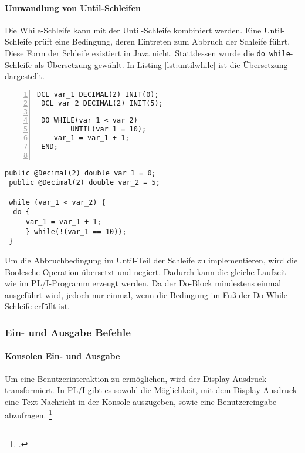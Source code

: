 \pagebreak
\paragraph*{Umwandlung von Until-Schleifen}

Die While-Schleife kann mit der Until-Schleife kombiniert werden. Eine Until-Schleife prüft eine Bedingung, deren Eintreten zum Abbruch der Schleife führt. Diese Form der Schleife existiert in Java nicht. Stattdessen wurde die \verb+do while+-Schleife als Übersetzung gewählt. In Listing \ref{lst:untilwhile} ist die Übersetzung dargestellt.

\begin{minipage}[b]{0.48\linewidth}
	\centering
	\lstset{language=PL/I,label=SliceExaple}
	\begin{lstlisting}[frame=single, numbers=left, mathescape,%
		caption={Transformation Until-Schleife}, label={lst:untilwhile}, basicstyle=\fontsize{9}{13}\selectfont\ttfamily]
 DCL var_1 DECIMAL(2) INIT(0);
 DCL var_2 DECIMAL(2) INIT(5);
		
 DO WHILE(var_1 < var_2) 
		UNTIL(var_1 = 10);
 	var_1 = var_1 + 1;
 END;
		
	\end{lstlisting}
\end{minipage}
\hspace{0.5cm}
\begin{minipage}[b]{0.48\linewidth}
	\centering
	\lstset{language=Java,label=SliceExaple}
	\begin{lstlisting}[frame=single, mathescape,%
		title={" "}, basicstyle=\fontsize{9}{13}\selectfont\ttfamily]
 public @Decimal(2) double var_1 = 0;
 public @Decimal(2) double var_2 = 5;
		
 while (var_1 < var_2) {
  do {
	 var_1 = var_1 + 1;
	 } while(!(var_1 == 10));
 }
	\end{lstlisting}
\end{minipage} 

Um die Abbruchbedingung im Until-Teil der Schleife zu implementieren, wird die Boolesche Operation übersetzt und negiert. Dadurch kann die gleiche Laufzeit wie im PL/I-Programm erzeugt werden. Da der Do-Block mindestens einmal ausgeführt wird, jedoch nur einmal, wenn die Bedingung im Fuß der Do-While-Schleife erfüllt ist.

\subsubsection{Ein- und Ausgabe Befehle}
\paragraph*{Konsolen Ein- und Ausgabe}
Um eine Benutzerinteraktion zu ermöglichen, wird der Display-Ausdruck transformiert.
In PL/I gibt es sowohl die Möglichkeit, mit dem Display-Ausdruck eine Text-Nachricht in der Konsole auszugeben, sowie eine Benutzereingabe abzufragen. \footcite[Vgl. ][S. 264ff.]{pliref}

